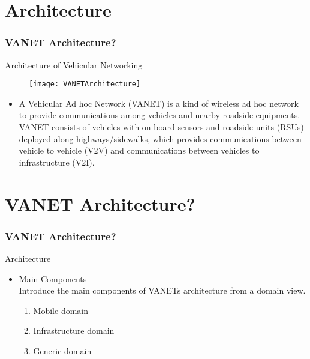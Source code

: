 \documentclass{beamer}
\begin{document}
\section{Architecture}

\begin{frame}
	\frametitle{VANET Architecture?}
	\begin{block}{Architecture of Vehicular Networking }
		\begin{figure}
\centering
\texttt{[image: VANETArchitecture]}
\end{figure}

		\begin{itemize}
			\item A  Vehicular  Ad  hoc  Network  (VANET)  is  a  kind  of  wireless  ad  hoc  network  to  provide communications  among  vehicles  and  nearby roadside equipments.  VANET  consists of vehicles with on board sensors and roadside units (RSUs) deployed along highways/sidewalks, which provides communications between vehicle to vehicle (V2V) and communications between vehicles to infrastructure (V2I).
			
			
		\end{itemize}
	\end{block}
	
\end{frame}








\section{VANET Architecture?}
\begin{frame}
	\frametitle{VANET Architecture?}
	\begin{block}{Architecture}
		\begin{itemize}
			\item Main Components\\
			Introduce the main components of  VANETs architecture from a domain view.\\
			\begin{enumerate}
			\item Mobile domain 
			\item Infrastructure domain
			\item Generic domain
			\end{enumerate}
		
			
		\end{itemize}
	\end{block}
	
\end{frame}
\end{document}
